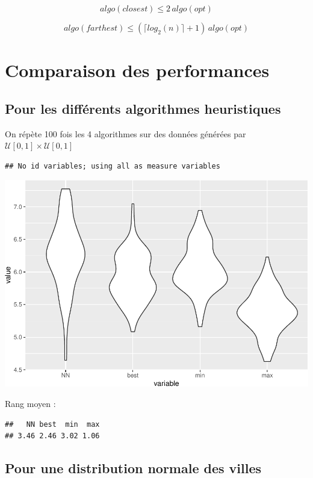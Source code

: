 \documentclass[
]{article}
\begin{document}
\[algo(closest) \le 2 \,algo(opt)\]

\[algo(farthest) \le (\lceil log_2(n) \rceil + 1) \,algo(opt)\]

\hypertarget{comparaison-des-performances}{%
\section{Comparaison des
performances}\label{comparaison-des-performances}}

\hypertarget{pour-les-diffuxe9rents-algorithmes-heuristiques}{%
\subsection{Pour les différents algorithmes
heuristiques}\label{pour-les-diffuxe9rents-algorithmes-heuristiques}}

On répète 100 fois les 4 algorithmes sur des données générées par
\(\mathcal{U}[0,1] \times \mathcal{U}[0,1]\)

\begin{verbatim}
## No id variables; using all as measure variables
\end{verbatim}

\includegraphics{rapport_TSP_files/figure-latex/unnamed-chunk-10-1.pdf}

Rang moyen :

\begin{verbatim}
##   NN best  min  max 
## 3.46 2.46 3.02 1.06
\end{verbatim}

\hypertarget{pour-une-distribution-normale-des-villes}{%
\subsection{Pour une distribution normale des
villes}\label{pour-une-distribution-normale-des-villes}}
\end{document}
